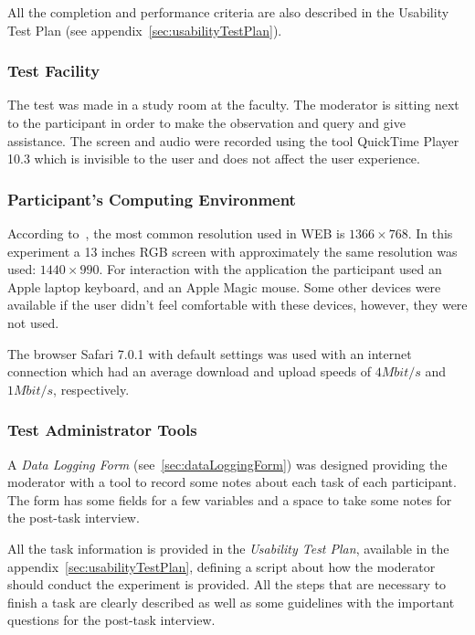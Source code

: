 \documentclass[a4paper]{article}
\begin{document}
All the completion and performance criteria are also described in the Usability Test Plan (see appendix~\ref{sec:usabilityTestPlan}).

\subsubsection{Test Facility}

The test was made in a study room at the faculty. The moderator is sitting next to the participant in order to make the observation and query and give assistance. The screen and audio were recorded using the tool QuickTime Player 10.3 which is invisible to the user and does not affect the user experience.

\subsubsection{Participant’s Computing Environment}

According to~\citep{satya2013resolution}, the most common resolution used in WEB is $1366\times 768$. In this experiment a 13 inches RGB screen with approximately the same resolution was used: $1440\times 990$. For interaction with the application the participant used an Apple laptop keyboard, and an Apple Magic mouse. Some other devices were available if the user didn't feel comfortable with these devices, however, they were not used.

The browser Safari 7.0.1 with default settings was used with an internet connection which had an average download and upload speeds of $4 Mbit/s$ and $1Mbit/s$, respectively.


\subsubsection{Test Administrator Tools}

A \emph{Data Logging Form} (see~\ref{sec:dataLoggingForm}) was designed providing the moderator with a tool to record some notes about each task of each participant. The form has some fields for a few variables and a space to take some notes for the post-task interview.

All the task information is provided in the \emph{Usability Test Plan}, available in the appendix~\ref{sec:usabilityTestPlan}, defining a script about how the moderator should conduct the experiment is provided. All the steps that are necessary to finish a task are clearly described as well as some guidelines with the important questions for the post-task interview.
\end{document}
